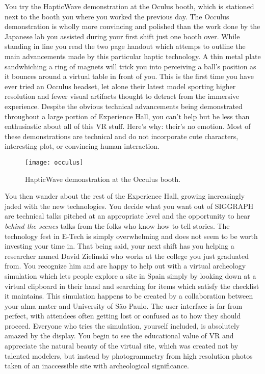 \documentclass[../main.tex]{subfiles}
\begin{document}
You try the HapticWave demonstration at the Oculus booth, which is stationed next to the booth you where you worked the previous day. The Occulus demonstration is wholly more convincing and polished than the work done by the Japanese lab you assisted during your first shift just one booth over. While standing in line you read the two page handout which attemps to outline the main advancements made by this particular haptic technology. A thin metal plate sandwhiching a ring of magnets will trick you into perceiving a ball's position as it bounces around a virtual table in front of you. This is the first time you have ever tried an Occulus headset, let alone their latest model sporting higher resolution and fewer visual artifacts thought to detract from the immersive experience. Despite the obvious technical advancements being demonstrated throughout a large portion of Experience Hall, you can't help but be less than enthusiastic about all of this VR stuff. Here's why: their's no emotion. Most of these demonstrations are technical and do not incorporate cute characters, interesting plot, or convincing human interaction.

\begin{figure}[h!]
	\centering
	\texttt{[image: occulus]}
	\caption*{HapticWave demonstration at the Occulus booth.}
\end{figure}

You then wander about the rest of the Experience Hall, growing increasingly jaded with the new technologies. You decide what you want out of SIGGRAPH are technical talks pitched at an appropriate level and the opportunity to hear \textit{behind the scenes} talks from the folks who know how to tell stories. The technology fest in E-Tech is simply overwhelming and does not seem to be worth investing your time in. That being said, your next shift has you helping a researcher named David Zielinski who works at the college you just graduated from. You recognize him and are happy to help out with a virtual archeology simulation which lets people explore a site in Spain simply by looking down at a virtual clipboard in their hand and searching for items which satisfy the checklist it maintains. This simulation happens to be created by a collaboration between your alma mater and University of São Paulo. The user interface is far from perfect, with attendees often getting lost or confused as to how they should proceed. Everyone who tries the simulation, yourself included, is absolutely amazed by the display. You begin to see the educational value of VR and appreciate the natural beauty of the virtual site, which was created not by talented modelers, but instead by photogrammetry from high resolution photos taken of an inaccessible site with archeological significance.
\end{document}
